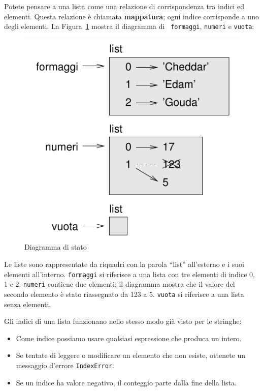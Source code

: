 \documentclass[10pt]{book}
\begin{document}
Potete pensare a una lista come una relazione di corrispondenza tra indici ed elementi. Questa relazione è chiamata {\bf mappatura}; ogni indice corrisponde a uno degli elementi. La Figura~\ref{fig.liststate} mostra il diagramma di {\tt
formaggi}, {\tt numeri} e {\tt vuota}:

\begin{figure}
\centerline
{\includegraphics[scale=0.8]{figs/liststate.pdf}}
\caption{Diagramma di stato}
\label{fig.liststate}
\end{figure}

Le liste sono rappresentate da riquadri con la parola ``list'' all'esterno e i suoi elementi all'interno.  {\tt formaggi} si riferisce a una lista con tre elementi di indice 0, 1 e 2.
{\tt numeri} contiene due elementi; il diagramma mostra che il valore del secondo elemento è stato riassegnato da 123 a 5. {\tt vuota} si riferisce a una lista senza elementi.

Gli indici di una lista funzionano nello stesso modo già visto per le stringhe:

\begin{itemize}

\item Come indice possiamo usare qualsiasi espressione che produca un intero.

\item Se tentate di leggere o modificare un elemento che non esiste, ottenete
   un messaggio d'errore {\tt IndexError}.

\item Se un indice ha valore negativo, il conteggio parte dalla fine della
   lista.

\end{itemize}
\end{document}
